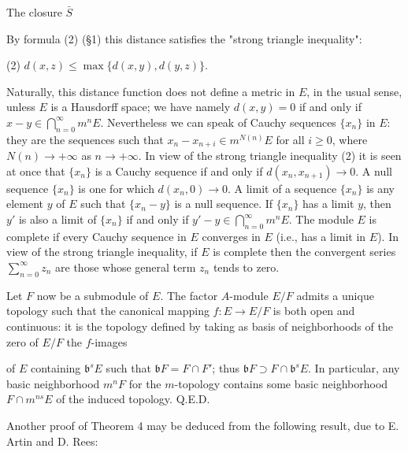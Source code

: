 The closure $\bar{S}$

By formula (2) (§1) this distance satisfies the "strong triangle inequality":

(2) $d(x, z) \leq \max \{d(x, y), d(y, z)\}$.

Naturally, this distance function does not define a metric in $E$, in the usual sense, unless $E$ is a Hausdorff space; we have namely $d(x, y) = 0$ if and only if $x - y \in \bigcap_{n=0}^{\infty} m^n E$. Nevertheless we can speak of Cauchy sequences $\{x_n\}$ in $E$: they are the sequences such that $x_n - x_{n+i} \in m^{N(n)} E$ for all $i \geq 0$, where $N(n) \to +\infty$ as $n \to +\infty$. In view of the strong triangle inequality (2) it is seen at once that $\{x_n\}$ is a Cauchy sequence if and only if $d(x_n, x_{n+1}) \to 0$. A null sequence $\{x_n\}$ is one for which $d(x_n, 0) \to 0$. A limit of a sequence $\{x_n\}$ is any element $y$ of $E$ such that $\{x_n - y\}$ is a null sequence. If $\{x_n\}$ has a limit $y$, then $y'$ is also a limit of $\{x_n\}$ if and only if $y' - y \in \bigcap_{n=0}^{\infty} m^n E$. The module $E$ is complete if every Cauchy sequence in $E$ converges in $E$ (i.e., has a limit in $E$). In view of the strong triangle inequality, if $E$ is complete then the convergent series $\sum_{n=0}^{\infty} z_n$ are those whose general term $z_n$ tends to zero.

Let $F$ now be a submodule of $E$. The factor $A$-module $E/F$ admits a unique topology such that the canonical mapping $f: E \to E/F$ is both open and continuous: it is the topology defined by taking as basis of neighborhoods of the zero of $E/F$ the $f$-images

of $E$ containing $\mathfrak{b}^s E$ such that $\mathfrak{b}F = F \cap F'$; thus $\mathfrak{b}F \supset F \cap \mathfrak{b}^s E$. In particular, any basic neighborhood $m^n F$ for the $m$-topology contains some basic neighborhood $F \cap m^{n s} E$ of the induced topology. Q.E.D.

Another proof of Theorem 4 may be deduced from the following result, due to E. Artin and D. Rees: